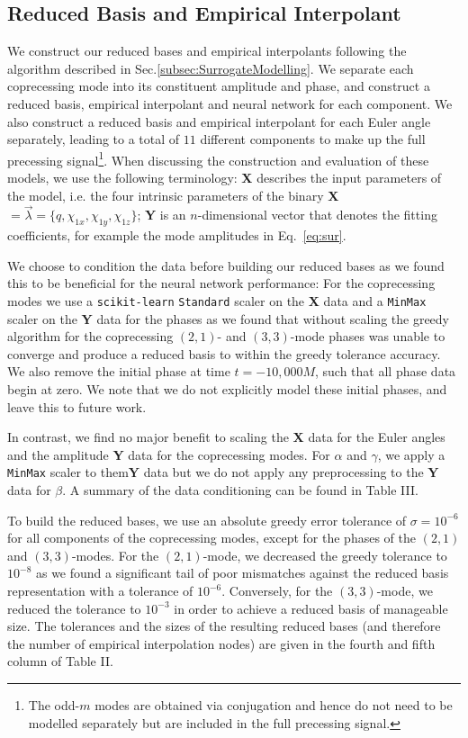 \documentclass[prd,amssymb,amsmath,amsfonts,superscriptaddress,nofootinbib,reprint,showpacs, longbibliography]{revtex4-1}
\newcommand{\minmax}{\texttt{MinMax}{ }}
\newcommand{\standard}{\texttt{Standard}{ }}
\newcommand{\scikitlearn}{\texttt{scikit-learn}{ }}
\newcommand{\Y}{\textbf{Y}{ }}
\newcommand{\X}{\textbf{X}{ }}
\begin{document}
\subsection{Reduced Basis and Empirical Interpolant}
\label{subsec:ReducedBasisAndEmpiricalInterpolant}
We construct our reduced bases and empirical interpolants following the algorithm described in Sec.\ref{subsec:SurrogateModelling}. We separate each coprecessing mode into its constituent amplitude and phase, and construct a reduced basis, empirical interpolant and neural network for each component. We also construct a reduced basis and empirical interpolant for each Euler angle separately, leading to a total of $11$ different components to make up the full precessing signal\footnote{The odd-$m$ modes are obtained via conjugation and hence do not need to be modelled separately but are included in the full precessing signal.}. When discussing the construction and evaluation of these models, we use the following terminology: 
\X describes the input parameters of the model, i.e. the four intrinsic parameters of the binary \X$=\vec{\lambda} = \{q, \chi_{1x}, \chi_{1y}, \chi_{1z}\}$; \Y is an $n$-dimensional vector that denotes the fitting coefficients, for example the mode amplitudes in Eq.~\eqref{eq:sur}. 

We choose to condition the data before building our reduced bases as we found this to be beneficial for the neural network performance: For the coprecessing modes we use a \scikitlearn\cite{scikit-learn} \standard scaler on the \X data and a \minmax scaler on the \Y data for the phases as we found that without scaling the greedy algorithm for the coprecessing $(2,1)$- and $(3,3)$-mode phases was unable to converge and produce a reduced basis to within the greedy tolerance accuracy. We also remove the initial phase at time $t=-10,000M$, such that all phase data begin at zero. We note that we do not explicitly model these initial phases, and leave this to future work.

In contrast, we find no major benefit to scaling the \X data for the Euler angles and the amplitude \Y data for the coprecessing modes. For $\alpha$ and $\gamma$, we apply a \minmax scaler to them$\Y$ data but we do not apply any preprocessing to the $\Y$ data for $\beta$. A summary of the data conditioning can be found in Table III. 

To build the reduced bases, we use an absolute greedy error tolerance of $\sigma = 10^{-6}$ for all components of the coprecessing modes, except for the phases of the $(2,1)$ and $(3,3)$-modes. For the $(2,1)$-mode, we decreased the greedy tolerance to $10^{-8}$ as we found a significant tail of poor mismatches against the reduced basis representation with a tolerance of $10^{-6}$. Conversely, for the $(3,3)$-mode, we reduced the tolerance to $10^{-3}$ in order to achieve a reduced basis of manageable size. The tolerances and the sizes of the resulting reduced bases (and therefore the number of empirical interpolation nodes) are given in the fourth and fifth column of Table II.
\end{document}
